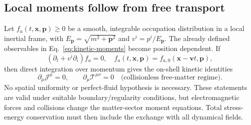 \documentclass[11pt,a4paper]{article}
\newcommand{\TT}{\mathcal T}
\newcommand{\JJ}{\mathcal J}
\begin{document}
\subsection{Local moments follow from free transport}
Let $f_a(t,\bm x,\bm p)\geq0$ be a smooth, integrable occupation distribution in a local inertial frame, with $E_{\bm p}=\sqrt{m^2+\bm p^2}$ and $v^i=p^i/E_{\bm p}$. The already defined observables in Eq.~\eqref{eq:kinetic-moments} become position dependent. If
\begin{equation}\label{eq:qgd006-streaming}
(\partial_t+v^i\partial_i)f_a=0,
\quad f_a(t,\bm x,\bm p)=f_{a,0}(\bm x-\bm vt,\bm p),
\end{equation}
then direct integration over momentum gives the on-shell kinetic identities
\begin{equation}\label{eq:qgd006-cons}
\boxed{\partial_\mu\JJ^\mu=0,\qquad \partial_\mu\TT^{\mu\nu}=0}
\quad\text{(collisionless free-matter regime)}.
\end{equation}
No spatial uniformity or perfect-fluid hypothesis is necessary. These statements are valid under suitable boundary/regularity conditions, but electromagnetic forces and collisions change the matter-sector moment equations. Total stress-energy conservation must then include the exchange with all dynamical fields.
\end{document}
